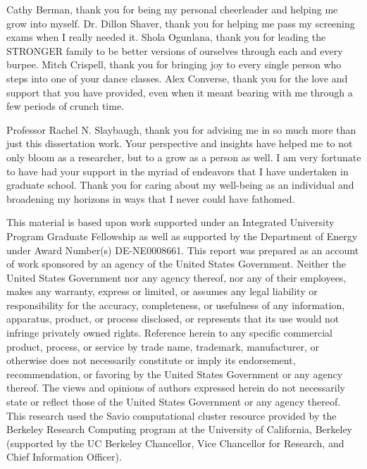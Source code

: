 \documentclass{ucbthesis}
\begin{document}
\begin{frontmatter}
\begin{acknowledgements}
Cathy Berman, thank you for being my personal cheerleader and helping me
grow into myself. Dr. Dillon Shaver, thank you for helping me pass my
screening exams when I really needed it.
Shola Ogunlana, thank you for leading the STRONGER family
to be better versions of ourselves through each and every burpee. Mitch
Crispell, thank you for bringing joy to every single person who steps into
one of your dance classes. Alex Converse, thank you for the love and support
that you have provided, even when it meant bearing with me through a few
periods of crunch time.

Professor Rachel N. Slaybaugh, thank you for advising me in so much more
than just this dissertation work. Your perspective and insights have helped
me to not only bloom as a researcher, but to a grow as a person as well. I
am very fortunate to have had your support in the myriad of endeavors that
I have undertaken in graduate school. Thank you for caring about my well-being
as an individual and broadening my horizons in ways that I never could have
fathomed.

\vspace{\fill}

\scriptsize{This material is based upon work supported under an Integrated
University Program Graduate Fellowship as well as supported by the Department 
of Energy under Award Number(s) DE-NE0008661. This report was prepared as an account 
of work sponsored by an agency of the United States Government. Neither the United 
States Government nor any agency thereof, nor any of their employees, makes any 
warranty, express or limited, or assumes any legal liability or responsibility for the 
accuracy, completeness, or usefulness of any information, apparatus, product, or
process disclosed, or represents that its use would not infringe privately owned
rights. Reference herein to any specific commercial product, process, or service by
trade name, trademark, manufacturer, or otherwise does not necessarily constitute or
imply its endorsement, recommendation, or favoring by the United States Government or
any agency thereof. The views and opinions of authors expressed herein do not 
necessarily state or reflect those of the United States Government or any agency 
thereof. This research used the Savio computational cluster resource provided by the 
Berkeley Research Computing program at the University of California, Berkeley 
(supported by the UC Berkeley Chancellor, Vice Chancellor for Research, and Chief 
Information Officer).}

\end{acknowledgements}

\end{frontmatter}
\end{document}

